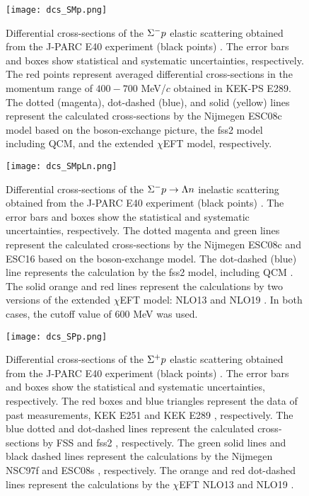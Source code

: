 \begin{figure}[!h]
  \begin{center}
   \texttt{[image: dcs\_SMp.png]}
   \caption{Differential cross-sections of the $\Sigma^{-}p$ elastic scattering obtained from the J-PARC E40 experiment (black points) \cite{Miwa-SMp}. The error bars and boxes show statistical and systematic uncertainties, respectively. The red points represent averaged differential cross-sections in the momentum range of $400-700$ MeV/$c$ obtained in KEK-PS E289. The dotted (magenta), dot-dashed (blue), and solid (yellow) lines represent the calculated cross-sections by the Nijmegen ESC08c model based on the boson-exchange picture, the fss2 model including QCM, and the extended $\chi$EFT model, respectively.}
   \label{fig-dcs_SMp}
 \end{center}
\end{figure}

\begin{figure}[!h]
  \begin{center}
   \texttt{[image: dcs\_SMpLn.png]}
   \caption{Differential cross-sections of the $\Sigma^- p \to \Lambda n$ inelastic scattering obtained from the J-PARC E40 experiment (black points) \cite{Miwa-SMLn}. The error bars and boxes show the statistical and systematic uncertainties, respectively. The dotted magenta and green lines represent the calculated cross-sections by the Nijmegen ESC08c \cite{OBP2} and ESC16 \cite{ESC16} based on the boson-exchange model. The dot-dashed (blue) line represents the calculation by the fss2 model, including QCM \cite{Fujiwara-2007}. The solid orange and red lines represent the calculations by two versions of the extended $\chi$EFT model: NLO13 \cite{NLO13} and NLO19 \cite{chiEFT-2020}. In both cases, the cutoff value of 600 MeV was used.}
   \label{fig-dcs_SMpLn}
 \end{center}
\end{figure}

\begin{figure}[!h]
  \begin{center}
   \texttt{[image: dcs\_SPp.png]}
   \caption{Differential cross-sections of the $\Sigma^{+}p$ elastic scattering obtained from the J-PARC E40 experiment (black points) \cite{Nana-SPp}. The error bars and boxes show the statistical and systematic uncertainties, respectively. The red boxes and blue triangles represent the data of past measurements, KEK E251 \cite{KEK1} and KEK E289 \cite{KEK3}, respectively. The blue dotted and dot-dashed lines represent the calculated cross-sections by FSS and fss2 \cite{Fujiwara-2007}, respectively. The green solid lines and black dashed lines represent the calculations by the Nijmegen NSC97f \cite{OBE-1999} and ESC08s \cite{OBP2}, respectively. The orange and red dot-dashed lines represent the calculations by the $\chi$EFT NLO13 \cite{NLO13} and NLO19 \cite{chiEFT-2020}.}
   \label{fig-dcs_SPp}
 \end{center}
\end{figure}

